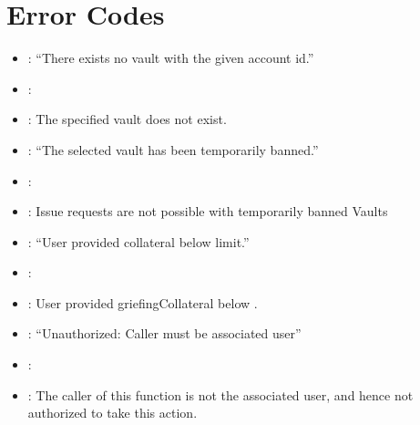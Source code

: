 \documentclass[a4paper,10pt,english]{sphinxmanual}
\begin{document}
\section{Error Codes}
\label{\detokenize{spec/issue:error-codes}}
\begin{itemize}
\item {} 
: “There exists no vault with the given account id.”

\item {} 
: {\hyperref[\detokenize{spec/issue:requestissue}]{}}

\item {} 
: The specified vault does not exist.

\end{itemize}

\begin{itemize}
\item {} 
: “The selected vault has been temporarily banned.”

\item {} 
: {\hyperref[\detokenize{spec/issue:requestissue}]{}}

\item {} 
:  Issue requests are not possible with temporarily banned Vaults

\end{itemize}

\begin{itemize}
\item {} 
: “User provided collateral below limit.”

\item {} 
: {\hyperref[\detokenize{spec/issue:requestissue}]{}}

\item {} 
: User provided griefingCollateral below .

\end{itemize}

\begin{itemize}
\item {} 
: “Unauthorized: Caller must be associated user”

\item {} 
: {\hyperref[\detokenize{spec/issue:executeissue}]{}}

\item {} 
: The caller of this function is not the associated user, and hence not authorized to take this action.

\end{itemize}
\end{document}
